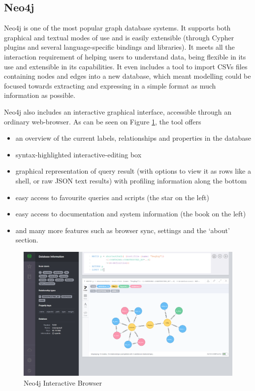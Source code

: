 \subsection{Neo4j}
\label{subsec:neo4jandtools}

Neo4j is one of the most popular graph database systems. It supports both
graphical and textual modes of use and is easily extensible (through Cypher
plugins and several language-specific bindings and libraries). It meets all the
interaction requirement of helping users to understand data, being flexible in
its use and extensible in its capabilities. It even includes a tool to import
CSVs files containing nodes and edges into a new database, which meant modelling
could be focused towards extracting and expressing in a simple format as much
information as possible.

Neo4j also includes an interactive graphical interface, accessible through an
ordinary web-browser. As can be seen on Figure \ref{fig:neo4jbrowser}, the tool
offers 
\begin{itemize}
  \item an overview of the current labels, relationships and properties in the
        database
  \item syntax-highlighted interactive-editing box
  \item graphical representation of query result (with options to view it as
        rows like a shell, or raw JSON text results) with profiling information
        along the bottom
  \item easy access to favourite queries and scripts (the star on the left)
  \item easy access to documentation and system information (the book on the
        left)
  \item and many more features such as browser sync, settings and the `about'
        section.
\end{itemize}

\begin{figure}[tbp]
  \label{fig:neo4jbrowser}
  \includegraphics[width=\textwidth]{img/Neo4j_Browser.png}
  \caption{Neo4j Interactive Browser}
\end{figure}

